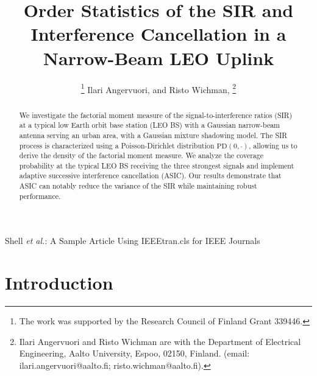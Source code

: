 \documentclass[lettersize,journal]{IEEEtran}
\begin{document}
\title{Order Statistics of the SIR and Interference Cancellation in a Narrow-Beam LEO Uplink}
\author{
  \thanks{The work was supported by the Research Council of Finland Grant 339446.}
   Ilari Angervuori,   and Risto Wichman,  \thanks{Ilari Angervuori and Risto Wichman are with the Department of Electrical Engineering, Aalto University, Espoo, 02150, Finland. (email: ilari.angervuori@aalto.fi; risto.wichman@aalto.fi).}
 }

%
{Shell \MakeLowercase{\textit{et al.}}: A Sample Article Using IEEEtran.cls for IEEE Journals}

\IEEEpubid{}


\maketitle
\begin{abstract}
We investigate the factorial moment measure of the signal-to-interference ratios (SIR) at a typical low Earth orbit base station (LEO BS) with a Gaussian narrow-beam antenna serving an urban area, with a Gaussian mixture shadowing model. The SIR process is characterized using a Poisson-Dirichlet distribution $\text{PD}(0, \cdot)$, allowing us to derive the density of the factorial moment measure. We analyze the coverage probability at the typical LEO BS receiving the three strongest signals and implement adaptive successive interference cancellation (ASIC). Our results demonstrate that ASIC can notably reduce the variance of the SIR while maintaining robust performance.
\end{abstract}



\section{Introduction}
\end{document}
